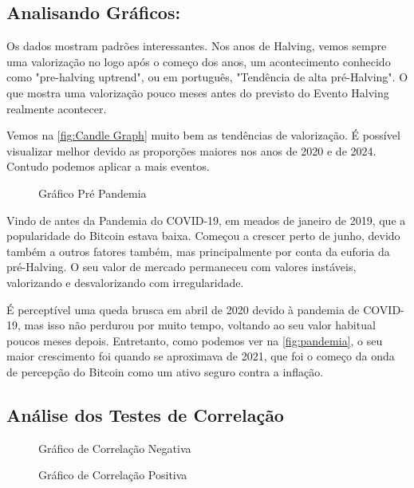 \subsection{\textbf{Analisando Gráficos:}}

Os dados mostram padrões interessantes. Nos anos de Halving, vemos sempre uma valorização no logo após o começo dos anos, um acontecimento conhecido como "pre-halving uptrend", ou em português, "Tendência de alta pré-Halving". O que mostra uma valorização pouco meses antes do previsto do Evento Halving realmente acontecer. 

Vemos na \cref{fig:Candle Graph} muito bem as tendências de valorização. É possível visualizar melhor devido as proporções  maiores nos anos de 2020 e de 2024. Contudo podemos aplicar a mais eventos.

\begin{figure}[h]
    \centering
    \caption{Gráfico Pré Pandemia}
    \label{fig:pre pandemia}
\end{figure}

Vindo de antes da Pandemia do COVID-19, em meados de janeiro de 2019, que a popularidade do Bitcoin estava baixa. Começou a crescer perto de junho, devido também a outros fatores também, mas principalmente por conta da euforia da pré-Halving. O seu valor de mercado permaneceu com valores instáveis, valorizando e desvalorizando com irregularidade. 

É perceptível uma queda brusca em abril de 2020 devido à pandemia de COVID-19, mas isso não perdurou por muito tempo, voltando ao seu valor habitual poucos meses depois. Entretanto, como podemos ver na \cref{fig:pandemia}, o seu maior crescimento foi quando se aproximava de 2021, que foi o começo da onda de percepção do Bitcoin como um ativo seguro contra a inflação.

\newpage

\subsection{\textbf{Análise dos Testes de Correlação}}

\begin{figure}[ht]
  \centering
  \begin{minipage}{0.48\linewidth}
    \centering
    \caption{Gráfico de Correlação Negativa}
    \label{fig:correlacao-negativa}
  \end{minipage}\hfill
  \begin{minipage}{0.48\linewidth}
    \centering
    \caption{Gráfico de Correlação Positiva}
    \label{fig:correlacao-positiva}
  \end{minipage}
\end{figure}

